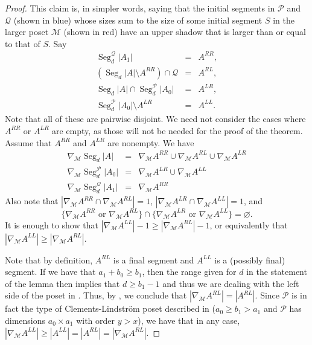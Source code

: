 \documentclass[11pt, reqno]{amsart}
\newcommand{\Q}{{\mathcal Q}}
\newcommand{\M}{{\mathcal M}}
\renewcommand{\P}{{\mathcal P}}
\def\Seg{\operatorname{Seg}}
\theoremstyle{plain} %
\theoremstyle{definition}
\theoremstyle{remark}
\numberwithin{equation}{section}  %
\begin{document}
\begin{proof}
    This claim is, in simpler words, saying that the initial segments in $\P$ and $\Q$ (shown in blue) whose sizes sum to the size of some initial segment $S$ in the larger poset $\M$ (shown in red) have an upper shadow that is larger than or equal to that of $S$. Say 
    \begin{eqnarray*}
        \Seg_d^{\Q}|A_1| &=& A^{RR},\\
        (\Seg_d|A|\setminus A^{RR})\cap \Q &=& A^{RL},\\ \Seg_d|A|\cap \Seg_d^{\P}|A_0| &=& A^{LR}, \\
        \Seg_d^{\P}|A_0|\setminus A^{LR} &=& A^{LL}.
    \end{eqnarray*}
Note that all of these are pairwise disjoint. We need not consider the cases where $A^{RR}$ or $A^{LR}$ are empty, as those will not be needed for the proof of the theorem. Assume that $A^{RR}$ and $A^{LR}$ are nonempty. We have
\begin{eqnarray*}
\nabla_{\mathcal{M}}\Seg_d|A| &=& \nabla_{\mathcal{M}}A^{RR} \cup \nabla_{\mathcal{M}}A^{RL} \cup \nabla_{\mathcal{M}}A^{LR}\\
\nabla_{\mathcal{M}}\Seg_d^\P|A_0| &=&\nabla_{\mathcal{M}}A^{LR} \cup \nabla_{\mathcal{M}}A^{LL} \\
\nabla_{\mathcal{M}}\Seg_d^\Q|A_1|&=&\nabla_{\mathcal{M}}A^{RR}
\end{eqnarray*}
Also note that $|\nabla_{\mathcal{M}}A^{RR} \cap \nabla_{\mathcal{M}}A^{RL}|=1$, $|\nabla_{\mathcal{M}}A^{LR} \cap \nabla_{\mathcal{M}}A^{LL}|=1$, and 
\begin{equation*}
\{\nabla_{\mathcal{M}}A^{RR} \text{ or } \nabla_{\mathcal{M}}A^{RL}\} \cap \{\nabla_{\mathcal{M}}A^{LR} \text{ or } \nabla_{\mathcal{M}}A^{LL}\} = \varnothing.
\end{equation*}
It is enough to show that $|\nabla_{\mathcal{M}}A^{LL}|-1 \geq |\nabla_{\mathcal{M}}A^{RL}|-1$, or equivalently that $|\nabla_{\mathcal{M}}A^{LL}| \geq |\nabla_{\mathcal{M}}A^{RL}|$.

Note that by definition, $A^{RL}$ is a  final segment and $A^{LL}$ is a (possibly final) segment. If we have that $a_1+b_0 \geq b_1$, then the range given for $d$ in the statement of the lemma then implies that $d \geq b_1-1$ and thus we are dealing with the left side of the poset in . Thus, by , we conclude that $|\nabla_{\mathcal{M}}A^{RL}| = |A^{RL}|$. Since $\P$ is in fact the type of Clements-Lindstr\"om poset described in  ($a_0 \geq b_1 > a_1$ and $\P$ has dimensions $a_0 \times a_1$ with order $y>x$), we have that in any case, $|\nabla_{\mathcal{M}}A^{LL}| \geq |A^{LL}| = |A^{RL}| = |\nabla_{\mathcal{M}}A^{RL}|$. 
    

\end{proof}
\end{document}
